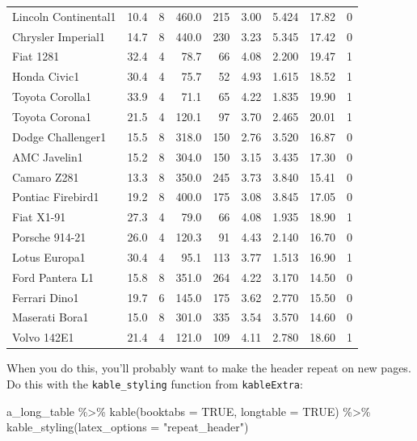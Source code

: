 \documentclass[a4paper, nobind]{templates/ociamthesis}
\newenvironment{Shaded}{\begin{snugshade}}{\end{snugshade}}
\newcommand{\AttributeTok}[1]{\textcolor[rgb]{0.77,0.63,0.00}{#1}}
\newcommand{\ConstantTok}[1]{\textcolor[rgb]{0.00,0.00,0.00}{#1}}
\newcommand{\FunctionTok}[1]{\textcolor[rgb]{0.00,0.00,0.00}{#1}}
\newcommand{\NormalTok}[1]{#1}
\newcommand{\SpecialCharTok}[1]{\textcolor[rgb]{0.00,0.00,0.00}{#1}}
\newcommand{\StringTok}[1]{\textcolor[rgb]{0.31,0.60,0.02}{#1}}
\renewenvironment{Shaded}
{
  \vspace{10pt}%
  \begin{snugshade}%
}{%
  \end{snugshade}%
  \vspace{8pt}%
}
\begin{document}
\begin{longtable}{lrrrrrrrr}
Lincoln Continental1 & 10.4 & 8 & 460.0 & 215 & 3.00 & 5.424 & 17.82 & 0\\
Chrysler Imperial1 & 14.7 & 8 & 440.0 & 230 & 3.23 & 5.345 & 17.42 & 0\\
Fiat 1281 & 32.4 & 4 & 78.7 & 66 & 4.08 & 2.200 & 19.47 & 1\\
\addlinespace
Honda Civic1 & 30.4 & 4 & 75.7 & 52 & 4.93 & 1.615 & 18.52 & 1\\
Toyota Corolla1 & 33.9 & 4 & 71.1 & 65 & 4.22 & 1.835 & 19.90 & 1\\
Toyota Corona1 & 21.5 & 4 & 120.1 & 97 & 3.70 & 2.465 & 20.01 & 1\\
Dodge Challenger1 & 15.5 & 8 & 318.0 & 150 & 2.76 & 3.520 & 16.87 & 0\\
AMC Javelin1 & 15.2 & 8 & 304.0 & 150 & 3.15 & 3.435 & 17.30 & 0\\
\addlinespace
Camaro Z281 & 13.3 & 8 & 350.0 & 245 & 3.73 & 3.840 & 15.41 & 0\\
Pontiac Firebird1 & 19.2 & 8 & 400.0 & 175 & 3.08 & 3.845 & 17.05 & 0\\
Fiat X1-91 & 27.3 & 4 & 79.0 & 66 & 4.08 & 1.935 & 18.90 & 1\\
Porsche 914-21 & 26.0 & 4 & 120.3 & 91 & 4.43 & 2.140 & 16.70 & 0\\
Lotus Europa1 & 30.4 & 4 & 95.1 & 113 & 3.77 & 1.513 & 16.90 & 1\\
\addlinespace
Ford Pantera L1 & 15.8 & 8 & 351.0 & 264 & 4.22 & 3.170 & 14.50 & 0\\
Ferrari Dino1 & 19.7 & 6 & 145.0 & 175 & 3.62 & 2.770 & 15.50 & 0\\
Maserati Bora1 & 15.0 & 8 & 301.0 & 335 & 3.54 & 3.570 & 14.60 & 0\\
Volvo 142E1 & 21.4 & 4 & 121.0 & 109 & 4.11 & 2.780 & 18.60 & 1\\
\bottomrule
\end{longtable}

When you do this, you'll probably want to make the header repeat on new pages.
Do this with the \texttt{kable\_styling} function from \texttt{kableExtra}:

\begin{Shaded}
\begin{Highlighting}[]
\NormalTok{a\_long\_table }\SpecialCharTok{\%\textgreater{}\%} 
  \FunctionTok{kable}\NormalTok{(}\AttributeTok{booktabs =} \ConstantTok{TRUE}\NormalTok{, }\AttributeTok{longtable =} \ConstantTok{TRUE}\NormalTok{) }\SpecialCharTok{\%\textgreater{}\%} 
  \FunctionTok{kable\_styling}\NormalTok{(}\AttributeTok{latex\_options =} \StringTok{"repeat\_header"}\NormalTok{)}
\end{Highlighting}
\end{Shaded}
\end{document}
